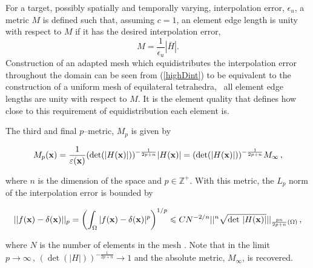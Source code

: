 For a target, possibly spatially and temporally varying, interpolation
error, $\epsilon_u$, a metric $M$ is defined such that, assuming
$c=1$, an element edge length is unity with respect to $M$ if it has
the desired interpolation error, \ie\
\begin{equation}
  M = \frac{1}{\epsilon_u} {|\bar{H}|}.
  \label{eqn:ME}
\end{equation}
Construction of an adapted mesh which equidistributes the
interpolation error throughout the domain can be seen from
(\ref{highDint}) to be equivalent to the construction of a uniform
mesh of equilateral tetrahedra, \ie\ all element edge lengths are
unity with respect to $M$. It is the element quality that defines how
close to this requirement of equidistribution each element is.

The third and final $p$--metric, $M_p$ is given by \citep{adaptivity_chen_07}

\begin{equation}\label{eq:metric_l2}
M_p({\bf x}) = \frac{1}{\epsilon({\bf x})}(\det(|H({\bf
x})|))^{-\frac{1}{2p+n}}|H({\bf x})| = (\det(|H({\bf
x})|))^{-\frac{1}{2p+n}}M_\infty \, ,
\end{equation}

where $n$ is the dimension of the space and $p \in \mathbb{Z}^+$. With
this metric, the $L_p$ norm of the interpolation error is bounded by

\begin{equation}
||f({\bf x})-\delta({\bf x})||_p = \left( \int_\Omega |f({\bf
x})-\delta({\bf x})|^{p} \right) ^{1/p} \leq CN^{-2/n}||^n \sqrt{\det
\, |H({\bf x})|}||_{\frac{pn}{2p+n}(\Omega)} \, ,
\end{equation}

where $N$ is the number of elements in the mesh
\citep{adaptivity_loseille_10-ii}. Note that in the limit \mbox{$p \to
  \infty\, , \, (\det(|H|))^{-\frac{1}{2p+n}} \to 1$} and the absolute
metric, $M_\infty$, is recovered.

